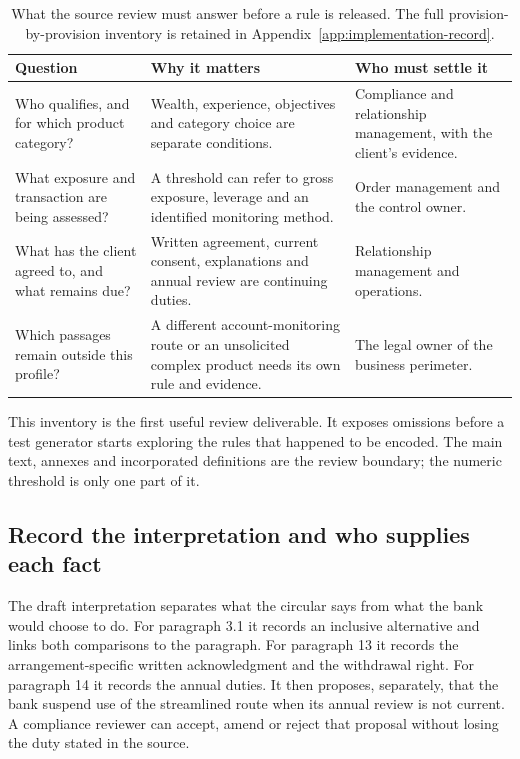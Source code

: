 
\begin{table}[htbp]
\centering
\caption{What the source review must answer before a rule is released. The
full provision-by-provision inventory is retained in Appendix~\ref{app:implementation-record}.}
\label{tab:circular-inventory-summary}
\begin{tabularx}{0.96\textwidth}{P{0.24\textwidth}P{0.32\textwidth}Y}
\toprule
Question & Why it matters & Who must settle it \\ \midrule
Who qualifies, and for which product category? & Wealth, experience, objectives and category choice are separate conditions. & Compliance and relationship management, with the client's evidence. \\
What exposure and transaction are being assessed? & A threshold can refer to gross exposure, leverage and an identified monitoring method. & Order management and the control owner. \\
What has the client agreed to, and what remains due? & Written agreement, current consent, explanations and annual review are continuing duties. & Relationship management and operations. \\
Which passages remain outside this profile? & A different account-monitoring route or an unsolicited complex product needs its own rule and evidence. & The legal owner of the business perimeter. \\
\bottomrule
\end{tabularx}
\end{table}


This inventory is the first useful review deliverable. It exposes omissions
before a test generator starts exploring the rules that happened to be encoded.
The main text, annexes and incorporated definitions are the review boundary;
the numeric threshold is only one part of it.

\subsection{Record the interpretation and who supplies each fact}
\label{merge:P-01b-complete-dry-run:03}


The draft interpretation separates what the circular says from what the bank
would choose to do. For paragraph 3.1 it records an inclusive alternative and
links both comparisons to the paragraph. For paragraph 13 it records the
arrangement-specific written acknowledgment and the withdrawal right. For
paragraph 14 it records the annual duties. It then proposes, separately, that
the bank suspend use of the streamlined route when its annual review is not
current. A compliance reviewer can accept, amend or reject that proposal
without losing the duty stated in the source.


